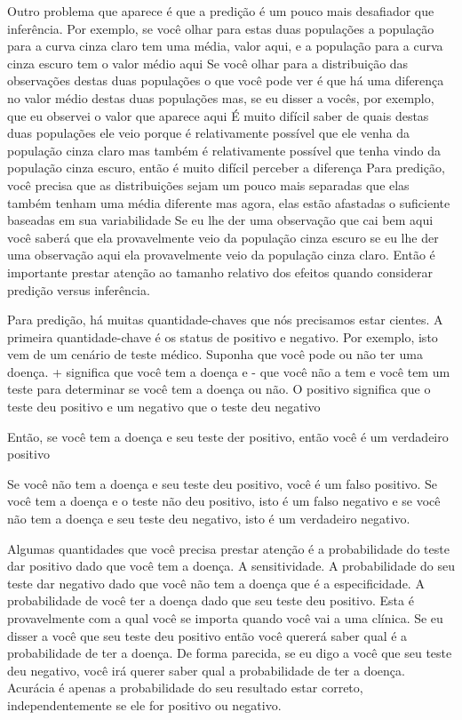 \begin{multicols}{2}
\begin{footnotesize}
Outro problema que aparece é que a predição é um pouco mais desafiador que inferência. Por exemplo, se você olhar para estas duas populações a população para a curva cinza claro tem uma média, valor aqui, e a população para a curva cinza escuro tem o valor médio aqui Se você olhar para a distribuição das observações destas duas populações o que você pode ver é que há uma diferença no valor médio destas duas populações mas, se eu disser a vocês, por exemplo, que eu observei o valor que aparece aqui É muito difícil saber de quais destas duas populações ele veio porque é relativamente possível que ele venha da população cinza claro mas também é relativamente possível que tenha vindo  da população cinza escuro, então é muito difícil perceber a diferença Para predição, você precisa que as distribuições sejam um pouco mais separadas que elas também tenham uma média diferente mas agora, elas estão afastadas o suficiente baseadas em sua variabilidade Se eu lhe der uma observação que cai bem aqui você saberá que ela provavelmente veio da população cinza escuro se eu lhe der uma observação aqui ela provavelmente veio da população cinza claro. Então é importante prestar atenção ao tamanho relativo dos efeitos quando considerar predição versus inferência. 

Para predição, há muitas quantidade-chaves que nós precisamos estar cientes. A primeira quantidade-chave é os status de positivo e negativo. Por exemplo, isto vem de um cenário de teste médico. Suponha que você pode ou não ter uma doença. + significa que você tem a doença e - que você não a tem e você tem um teste para determinar se você tem a doença ou não. O positivo significa que o teste deu positivo e um negativo que o teste deu negativo 

Então, se você tem a doença e seu teste der positivo, então você é um verdadeiro positivo 

Se você não tem a doença e seu teste deu positivo, você é um falso positivo. Se você tem a doença e o teste não deu positivo, isto é um falso negativo e se você não tem a doença e seu teste deu negativo, isto é um verdadeiro negativo. 

Algumas quantidades que você precisa prestar atenção é a probabilidade do teste dar positivo dado que você tem a doença. A sensitividade. A probabilidade do seu teste dar negativo dado que você não tem a doença que é a especificidade. A probabilidade de você ter a doença dado que seu teste deu positivo. Esta é provavelmente com a qual você se importa quando você vai a uma clínica. Se eu disser a você que seu teste deu positivo então você quererá saber qual é a probabilidade de ter a doença. De forma parecida, se eu digo a você que seu teste deu negativo, você irá querer saber qual a probabilidade de ter a doença. Acurácia é apenas a probabilidade do seu resultado estar correto, independentemente se ele for positivo ou negativo. 


\end{footnotesize}
\end{multicols}
